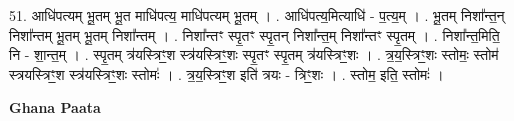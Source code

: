 \documentclass[17pt]{extarticle}
\begin{document}
51. आधि॑पत्यम् भू॒तम् भू॒त माधि॑पत्य॒ माधि॑पत्यम् भू॒तम् । . आधि॑पत्य॒मित्याधि॑ - प॒त्य॒म् । . भू॒तम् निशा᳚न्त॒न् निशा᳚न्तम् भू॒तम् भू॒तम् निशा᳚न्तम् । . निशा᳚न्तꣳ स्पृ॒तꣳ स्पृ॒तन् निशा᳚न्त॒म् निशा᳚न्तꣳ स्पृ॒तम् । . निशा᳚न्त॒मिति॒ नि - शा॒न्त॒म् । . स्पृ॒तम् त्र॑यस्त्रिꣳ॒॒श स्त्र॑यस्त्रिꣳ॒॒शः स्पृ॒तꣳ स्पृ॒तम् त्र॑यस्त्रिꣳ॒॒शः । . त्र॒य॒स्त्रिꣳ॒॒शः स्तोमः॒ स्तोम॑ स्त्रयस्त्रिꣳ॒॒श स्त्र॑यस्त्रिꣳ॒॒शः स्तोमः॑ । . त्र॒य॒स्त्रिꣳ॒॒श इति॑ त्रयः - त्रिꣳ॒॒शः । . स्तोम॒ इति॒ स्तोमः॑ । \newline

\textbf{Ghana Paata } \newline
\end{document}
